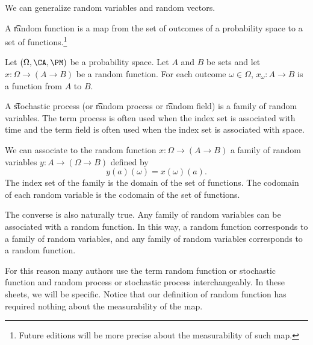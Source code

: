 

We can generalize random variables and random vectors.


A \t{random function} is a map from the set of outcomes of a probability space to a set of functions.\footnote{Future editions will be more precise about the measurability of such map.}


Let $(\Omega, \CA, \PM)$ be a probability space.
Let $A$ and $B$ be sets and let $x: \Omega \to (A \to B)$ be a random function.
For each outcome $\omega \in \Omega$, $x_{\omega}: A \to B$ is a function from $A$ to $B$.


A \t{stochastic process} (or \t{random process} or \t{random field}) is a family of random variables.
The term process is often used when the index set is associated with time and the term field is often used when the index set is associated with space.

We can associate to the random function $x: \Omega \to (A \to B)$ a family of random variables $y: A \to (\Omega \to B)$ defined by
\[
  y(a)(\omega) = x(\omega)(a).
\]
The index set of the family is the domain of the set of functions.
The codomain of each random variable is the codomain of the set of functions.

The converse is also naturally true.
Any family of random variables can be associated with a random function.
In this way, a random function corresponds to a family of random variables, and any family of random variables corresponds to a random function.

For this reason many authors use the term random function or stochastic function and random process or stochastic process interchangeably.
In these sheets, we will be specific.
Notice that our definition of random function has required nothing about the measurability of the map.

\blankpage
